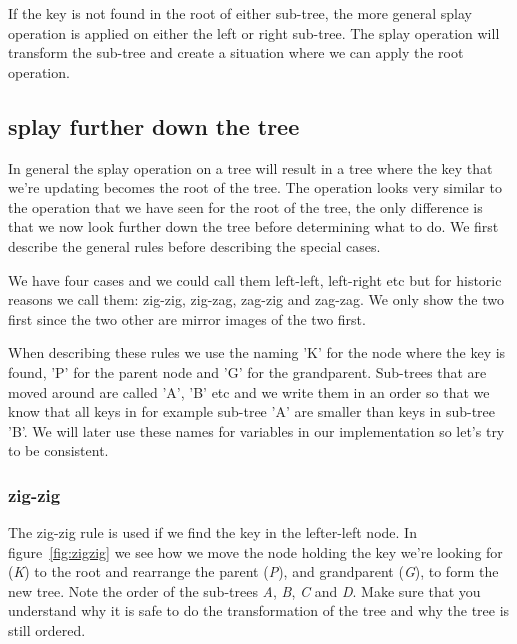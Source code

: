 \documentclass[a4paper,11pt]{article}
\begin{document}
If the key is not found in the root of either sub-tree, the more
general splay operation is applied on either the left or right
sub-tree. The splay operation will transform the sub-tree and create a
situation where we can apply the root operation.

\subsection{splay further down the tree}

In general the splay operation on a tree will result in a tree where
the key that we're updating becomes the root of the tree. The
operation looks very similar to the operation that we have seen for
the root of the tree, the only difference is that we now look further
down the tree before determining what to do. We first describe the
general rules before describing the special cases.

We have four cases and we could call them
left-left, left-right etc but for historic reasons we call them:
zig-zig, zig-zag, zag-zig and zag-zag. We only show the two first
since the two other are mirror images of the two first.

When describing these rules we use the naming 'K' for the node
where the key is found, 'P' for the parent node and 'G'
for the grandparent. Sub-trees that are moved around are called
'A', 'B' etc and we write them in an order so that we
know that all keys in for example sub-tree 'A' are smaller than
keys in sub-tree 'B'. We will later use these names for
variables in our implementation so let's try to be consistent.

\subsubsection*{zig-zig}

The zig-zig rule is used if we find the key in the lefter-left node. In
figure~\ref{fig:zigzig} we see how we move the node holding the key we're
looking for ({\em K}) to the root and rearrange the parent
({\em P}), and grandparent ({\em G}), to form the new tree. Note
the order of the sub-trees {\em A}, {\em B}, {\em C} and
{\em D}.  Make sure that you understand why it is safe to do the
transformation of the tree and why the tree is still ordered.
 
\end{document}
